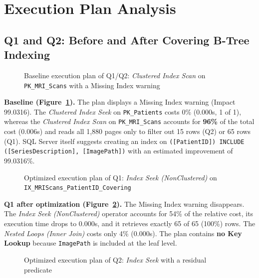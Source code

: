 \section{Execution Plan Analysis}
\label{sec:execution-plan}

\subsection{Q1 and Q2: Before and After Covering B-Tree Indexing}

\begin{figure}[H]
  \centering
  \caption{Baseline execution plan of Q1/Q2: \textit{Clustered Index Scan} on \texttt{PK\_MRI\_Scans} with a Missing Index warning}
  \label{fig:q12-baseline}
\end{figure}

\textbf{Baseline (Figure~\ref{fig:q12-baseline}).} The plan displays a Missing Index warning (Impact 99.0316). The \textit{Clustered Index Seek} on \texttt{PK\_Patients} costs 0\% (0.000s, 1 of 1), whereas the \textit{Clustered Index Scan} on \texttt{PK\_MRI\_Scans} accounts for \textbf{96\%} of the total cost (0.006s) and reads all 1,880 pages only to filter out 15 rows (Q2) or 65 rows (Q1). SQL Server itself suggests creating an index on \texttt{([PatientID]) INCLUDE ([SeriesDescription], [ImagePath])} with an estimated improvement of 99.0316\%.

\begin{figure}[H]
  \centering
  \caption{Optimized execution plan of Q1: \textit{Index Seek (NonClustered)} on \texttt{IX\_MRIScans\_PatientID\_Covering}}
  \label{fig:q1-optimized}
\end{figure}

\textbf{Q1 after optimization (Figure~\ref{fig:q1-optimized}).} The Missing Index warning disappears. The \textit{Index Seek (NonClustered)} operator accounts for 54\% of the relative cost, its execution time drops to 0.000s, and it retrieves exactly 65 of 65 (100\%) rows. The \textit{Nested Loops (Inner Join)} costs only 4\% (0.000s). The plan contains \textbf{no Key Lookup} because \texttt{ImagePath} is included at the leaf level.

\begin{figure}[H]
  \centering
  \caption{Optimized execution plan of Q2: \textit{Index Seek} with a residual predicate}
  \label{fig:q2-optimized}
\end{figure}

